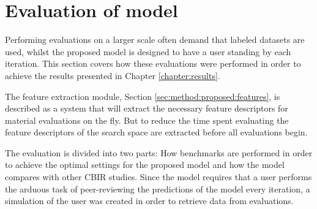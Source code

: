 
\section{Evaluation of model}
\label{sec:meth:evaluation}

Performing evaluations on a larger scale often demand that labeled datasets are used, whilst the proposed model is designed to have a user standing by each iteration. This section covers how these evaluations were performed in order to achieve the results presented in Chapter \ref{chapter:results}.

The feature extraction module, Section \ref{sec:method:proposed:features}, is described as a system that will extract the necessary feature descriptors for material evaluations on the fly. But to reduce the time spent evaluating the feature descriptors of the search space are extracted before all evaluations begin.

The evaluation is divided into two parts: How benchmarks are performed in order to achieve the optimal settings for the proposed model and how the model compares with other CBIR studies. 
Since the model requires that a user performs the arduous task of peer-reviewing the predictions of the model every iteration, a simulation of the user was created in order to retrieve data from evaluations.






